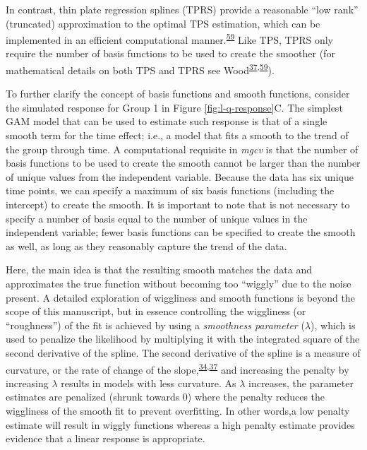 \documentclass[
]{article}
\begin{document}
In contrast, thin plate regression splines (TPRS) provide a reasonable ``low rank'' (truncated) approximation to the optimal TPS estimation, which can be implemented in an efficient computational manner.\textsuperscript{\protect\hyperlink{ref-wood2003}{59}} Like TPS, TPRS only require the number of basis functions to be used to create the smoother (for mathematical details on both TPS and TPRS see Wood\textsuperscript{\protect\hyperlink{ref-wood2017}{37},\protect\hyperlink{ref-wood2003}{59}}).

To further clarify the concept of basis functions and smooth functions, consider the simulated response for Group 1 in Figure \ref{fig:l-q-response}C. The simplest GAM model that can be used to estimate such response is that of a single smooth term for the time effect; i.e., a model that fits a smooth to the trend of the group through time. A computational requisite in \emph{mgcv} is that the number of basis functions to be used to create the smooth cannot be larger than the number of unique values from the independent variable. Because the data has six unique time points, we can specify a maximum of six basis functions (including the intercept) to create the smooth. It is important to note that is not necessary to specify a number of basis equal to the number of unique values in the independent variable; fewer basis functions can be specified to create the smooth as well, as long as they reasonably capture the trend of the data.

Here, the main idea is that the resulting smooth matches the data and approximates the true function without becoming too ``wiggly'' due to the noise present. A detailed exploration of wiggliness and smooth functions is beyond the scope of this manuscript, but in essence controlling the wiggliness (or ``roughness'') of the fit is achieved by using a \emph{smoothness parameter} (\(\lambda\)), which is used to penalize the likelihood by multiplying it with the integrated square of the second derivative of the spline. The second derivative of the spline is a measure of curvature, or the rate of change of the slope,\textsuperscript{\protect\hyperlink{ref-simpson2018}{34},\protect\hyperlink{ref-wood2017}{37}} and increasing the penalty by increasing \(\lambda\) results in models with less curvature. As \(\lambda\) increases, the parameter estimates are penalized (shrunk towards 0) where the penalty reduces the wiggliness of the smooth fit to prevent overfitting. In other words,a low penalty estimate will result in wiggly functions whereas a high penalty estimate provides evidence that a linear response is appropriate.
\end{document}
